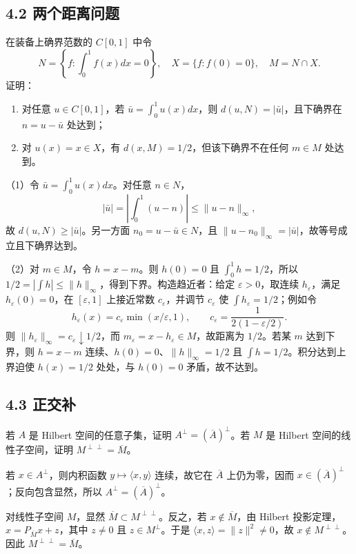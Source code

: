 \subsection*{4.2 两个距离问题}
\begin{problem}
在装备上确界范数的 $C[0,1]$ 中令
\[
N=\left\{f:\int_0^1f(x)dx=0\right\},\quad
X=\{f:f(0)=0\},\quad M=N\cap X.
\]
证明：
\begin{enumerate}[label=(\arabic*)]
\item 对任意 $u\in C[0,1]$，若 $\bar u=\int_0^1u(x)dx$，则
$d(u,N)=|\bar u|$，且下确界在 $n=u-\bar u$ 处达到；
\item 对 $u(x)=x\in X$，有 $d(x,M)=1/2$，但该下确界不在任何 $m\in M$ 处达到。
\end{enumerate}
\end{problem}
（1）令 $\bar u=\int_0^1u(x)dx$。对任意 $n\in N$，
\[
|\bar u|=\left|\int_0^1(u-n)\right|\le\|u-n\|_\infty,
\]
故 $d(u,N)\ge|\bar u|$。另一方面 $n_0=u-\bar u\in N$，且
$\|u-n_0\|_\infty=|\bar u|$，故等号成立且下确界达到。

（2）对 $m\in M$，令 $h=x-m$。则 $h(0)=0$ 且 $\int_0^1h=1/2$，所以
$1/2=|\int h|\le\|h\|_\infty$，得到下界。构造趋近者：给定 $\varepsilon>0$，取连续 $h_\varepsilon$，满足 $h_\varepsilon(0)=0$，在 $[\varepsilon,1]$ 上接近常数 $c_\varepsilon$，并调节 $c_\varepsilon$ 使 $\int h_\varepsilon=1/2$；例如令
\[
h_\varepsilon(x)=c_\varepsilon\min(x/\varepsilon,1),\qquad
c_\varepsilon=\frac1{2(1-\varepsilon/2)}.
\]
则 $\|h_\varepsilon\|_\infty=c_\varepsilon\downarrow1/2$，而 $m_\varepsilon=x-h_\varepsilon\in M$，故距离为 $1/2$。若某 $m$ 达到下界，则 $h=x-m$ 连续、$h(0)=0$、$\|h\|_\infty=1/2$ 且 $\int h=1/2$。积分达到上界迫使 $h(x)=1/2$ 处处，与 $h(0)=0$ 矛盾，故不达到。

\subsection*{4.3 正交补}
\begin{problem}
若 $A$ 是 Hilbert 空间的任意子集，证明 $A^\perp=(\overline A)^\perp$。若 $M$ 是 Hilbert 空间的线性子空间，证明 $M^{\perp\perp}=\overline M$。
\end{problem}
若 $x\in A^\perp$，则内积函数 $y\mapsto\langle x,y\rangle$ 连续，故它在 $\overline A$ 上仍为零，因而 $x\in(\overline A)^\perp$；反向包含显然，所以 $A^\perp=(\overline A)^\perp$。

对线性子空间 $M$，显然 $\overline M\subset M^{\perp\perp}$。反之，若 $x\notin\overline M$，由 Hilbert 投影定理，$x=P_{\overline M}x+z$，其中 $z\ne0$ 且 $z\in M^\perp$。于是 $\langle x,z\rangle=\|z\|^2\ne0$，故 $x\notin M^{\perp\perp}$。因此 $M^{\perp\perp}=\overline M$。

